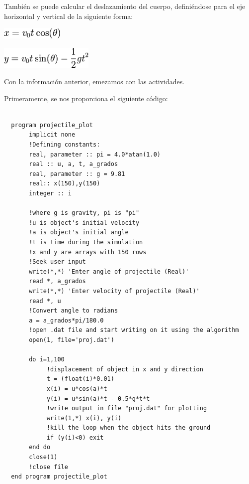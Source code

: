 \documentclass[12pt]{article}
\begin{document}
También se puede calcular el deslazamiento del cuerpo, definiéndose para el eje horizontal y vertical de la siguiente forma:


\begin{center}
	\includegraphics[width=3cm]{desx.png}\\
\end{center}
\begin{center}
	\includegraphics[width=4.5cm]{desy.png}\\
\end{center}

Con la información anterior, emezamos con las actividades.

Primeramente, se nos proporciona el siguiente código:

\begin{verbatim}

  program projectile_plot  
       implicit none  
       !Defining constants:  
       real, parameter :: pi = 4.0*atan(1.0) 
       real :: u, a, t, a_grados  
       real, parameter :: g = 9.81  
       real:: x(150),y(150)  
       integer :: i 

       !where g is gravity, pi is "pi"   
       !u is object's initial velocity   
       !a is object's initial angle   
       !t is time during the simulation   
       !x and y are arrays with 150 rows   
       !Seek user input   
       write(*,*) 'Enter angle of projectile (Real)'   
       read *, a_grados   
       write(*,*) 'Enter velocity of projectile (Real)'   
       read *, u   
       !Convert angle to radians   
       a = a_grados*pi/180.0   
       !open .dat file and start writing on it using the algorithm   
       open(1, file='proj.dat')   
         
       do i=1,100   
            !displacement of object in x and y direction   
            t = (float(i)*0.01)   
            x(i) = u*cos(a)*t   
            y(i) = u*sin(a)*t - 0.5*g*t*t   
            !write output in file "proj.dat" for plotting   
            write(1,*) x(i), y(i)   
            !kill the loop when the object hits the ground   
            if (y(i)<0) exit   
       end do   
       close(1)   
       !close file   
  end program projectile_plot 
\end{verbatim} 
\end{document}
